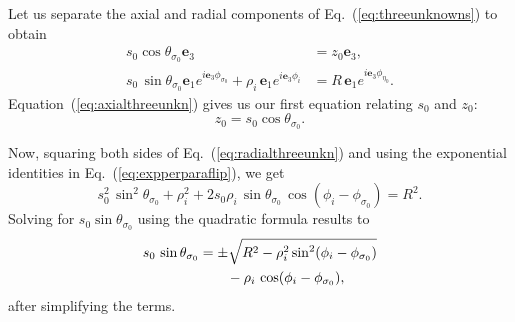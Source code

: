 \documentclass[a4paper,twocolumn,superscriptaddress]{revtex4-1}
\begin{document}
{Let us separate the axial and radial components of Eq.~(\ref{eq:threeunknowns}) to obtain
\begin{subequations}
  \label{eq:axialradialthreeunkn}
  \begin{align}
    \label{eq:axialthreeunkn}
    s_0 \cos \theta_{ \sigma_0 } \mathbf e_3 &= 
    z_0 \mathbf e_3 ,
    \\
    \label{eq:radialthreeunkn}
    s_0 \, \sin \theta_{ \sigma_0 } \mathbf e_1 e^{i \mathbf e_3 \phi_{ \sigma_0 }} +
    \rho_i \, \mathbf e_1 e^{ i \mathbf e_3 \phi_i } &= 
    R\, \mathbf e_1 e^{ i \mathbf e_3 \phi_{ \eta_0 } } .
  \end{align}
\end{subequations}
Equation~(\ref{eq:axialthreeunkn}) gives us our first equation relating $s_0$ and $z_0$:
\begin{equation}
  \label{eq:s0z1relation}
 z_0 =  s_0 \cos \theta_{ \sigma_0 }.
\end{equation}

Now, squaring both sides of Eq.~(\ref{eq:radialthreeunkn}) and using the exponential identities in Eq.~(\ref{eq:expperparaflip}), we get
\begin{equation}
  s_0^2 \, \sin^2 \theta_{ \sigma_0 } + \rho_i^2 + 
  2 s_0 \rho_i \, \sin \theta_{ \sigma_0 } \, \cos (\phi_i  - \phi_{ \sigma_0 })
  = 
  R^2 .
\end{equation}
Solving for $s_0 \sin \theta_{ \sigma_0 }$ using the quadratic formula results to
\begin{align}
\label{eq:s0plmin}
  s_0\, \sin \theta_{ \sigma_0 } &= 
  \pm \sqrt{ R^2 - \rho_i^2 \sin^2(\phi_i - \phi_{ \sigma_0 }) } \notag
\\
 & \qquad - 
  \rho_i\,\cos(\phi_i - \phi_{ \sigma_0 }) ,
\end{align}
after simplifying the terms.

}
\end{document}
